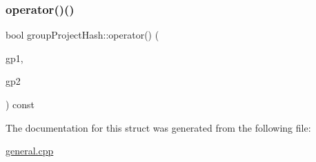 \subsubsection{\texorpdfstring{operator()()}{operator()()}\hspace{0.1cm}{\footnotesize\ttfamily [2/2]}}
{\footnotesize\ttfamily bool group\+Project\+Hash\+::operator() (\begin{DoxyParamCaption}\item[{const \hyperlink{classgroup_project}{group\+Project} $\ast$}]{gp1,  }\item[{const \hyperlink{classgroup_project}{group\+Project} $\ast$}]{gp2 }\end{DoxyParamCaption}) const\hspace{0.3cm}{\ttfamily [inline]}}



The documentation for this struct was generated from the following file\+:\begin{DoxyCompactItemize}
\item 
\hyperlink{general_8cpp}{general.\+cpp}\end{DoxyCompactItemize}
